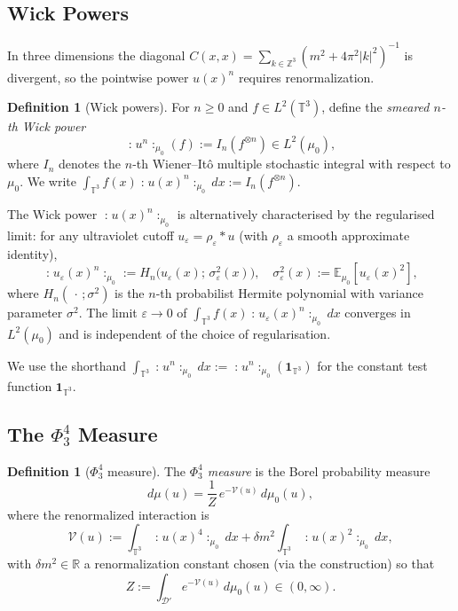 \documentclass[11pt,a4paper]{article}
\theoremstyle{plain}
\theoremstyle{definition}
\newtheorem{definition}[theorem]{Definition}
\newcommand{\T}{\mathbb{T}}
\newcommand{\R}{\mathbb{R}}
\newcommand{\cD}{\mathcal{D}}
\newcommand{\cV}{\mathcal{V}}
\newcommand{\E}{\mathbb{E}}
\newcommand{\wick}[1]{\mathopen{:}\!#1\!\mathclose{:}}
\begin{document}
\subsection{Wick Powers}

In three dimensions the diagonal $C(x,x)=\sum_{k\in\mathbb{Z}^3}(m^2+4\pi^2|k|^2)^{-1}$ is
divergent, so the pointwise power $u(x)^n$ requires renormalization.

\begin{definition}[Wick powers]\label{def:wick}
For $n\ge 0$ and $f\in L^2(\T^3)$, define the \emph{smeared $n$-th Wick power}
\begin{equation}\label{eq:wick-def}
  \wick{u^n}_{\mu_0}(f) := I_n(f^{\otimes n}) \in L^2(\mu_0),
\end{equation}
where $I_n$ denotes the $n$-th Wiener--It\^o multiple stochastic integral with respect to $\mu_0$.
We write $\int_{\T^3}f(x)\wick{u(x)^n}_{\mu_0}\,dx := I_n(f^{\otimes n})$.

The Wick power $\wick{u(x)^n}_{\mu_0}$ is alternatively characterised by the regularised limit:
for any ultraviolet cutoff $u_\varepsilon = \rho_\varepsilon * u$ (with $\rho_\varepsilon$
a smooth approximate identity),
\[
  \wick{u_\varepsilon(x)^n}_{\mu_0} := H_n\!\bigl(u_\varepsilon(x);\,\sigma_\varepsilon^2(x)\bigr),
  \quad \sigma_\varepsilon^2(x) := \E_{\mu_0}[u_\varepsilon(x)^2],
\]
where $H_n(\,\cdot\,;\sigma^2)$ is the $n$-th probabilist Hermite polynomial with variance
parameter $\sigma^2$.  The limit $\varepsilon\to 0$ of $\int_{\T^3}f(x)\wick{u_\varepsilon(x)^n}_{\mu_0}\,dx$
converges in $L^2(\mu_0)$ and is independent of the choice of regularisation.
\end{definition}

We use the shorthand $\int_{\T^3}\wick{u^n}_{\mu_0}\,dx := \wick{u^n}_{\mu_0}(\mathbf{1}_{\T^3})$
for the constant test function $\mathbf{1}_{\T^3}$.

\subsection{The $\Phi^4_3$ Measure}

\begin{definition}[$\Phi^4_3$ measure]\label{def:phi4}
The \emph{$\Phi^4_3$ measure} is the Borel probability measure
\begin{equation}\label{eq:phi4-def}
  d\mu(u) = \frac{1}{Z}\,e^{-\cV(u)}\,d\mu_0(u),
\end{equation}
where the renormalized interaction is
\begin{equation}\label{eq:action}
  \cV(u) := \int_{\T^3}\wick{u(x)^4}_{\mu_0}\,dx
            + \delta m^2\int_{\T^3}\wick{u(x)^2}_{\mu_0}\,dx,
\end{equation}
with $\delta m^2\in\R$ a renormalization constant chosen (via the construction) so that
\[
  Z := \int_{\cD'} e^{-\cV(u)}\,d\mu_0(u) \in (0,\infty).
\]
\end{definition}
\end{document}
